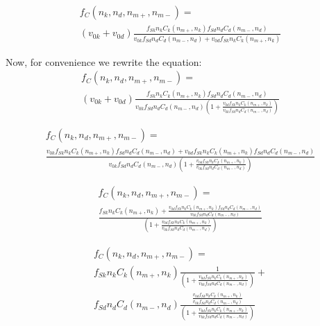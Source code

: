 \begin{equation}
\begin{split}
f_C(n_k, n_d, n_{m+}, n_{m-}) = \\
(v_{0k} + v_{0d})\frac{f_{Sk}n_kC_k(n_{m+}, n_k)f_{Sd}n_dC_d(n_{m-},n_d)}{v_{0k}f_{Sd}n_dC_d(n_{m-},n_d) + v_{0d}f_{Sk}n_kC_k(n_{m+}, n_k)}
\end{split}
\end{equation}

Now, for convenience we rewrite the equation:
\begin{equation}
\begin{split}
f_C(n_k, n_d, n_{m+}, n_{m-}) = \\
(v_{0k} + v_{0d})\frac{f_{Sk}n_kC_k(n_{m+}, n_k)f_{Sd}n_dC_d(n_{m-},n_d)}
{v_{0k}f_{Sd}n_dC_d(n_{m-},n_d) (1 + \frac{v_{0d}f_{Sk}n_kC_k(n_{m+}, n_k)}{v_{0k}f_{Sd}n_dC_d(n_{m-},n_d)})}
\end{split}
\end{equation}

\begin{equation}
\begin{split}
f_C(n_k, n_d, n_{m+}, n_{m-}) = \\
\frac{v_{0k}f_{Sk}n_kC_k(n_{m+}, n_k)f_{Sd}n_dC_d(n_{m-},n_d) + v_{0d}f_{Sk}n_kC_k(n_{m+}, n_k)f_{Sd}n_dC_d(n_{m-},n_d)}
{v_{0k}f_{Sd}n_dC_d(n_{m-},n_d) (1 + \frac{v_{0d}f_{Sk}n_kC_k(n_{m+}, n_k)}{v_{0k}f_{Sd}n_dC_d(n_{m-},n_d)})}
\end{split}
\end{equation}

\begin{equation}
\begin{split}
f_C(n_k, n_d, n_{m+}, n_{m-}) = \\
\frac{f_{Sk}n_kC_k(n_{m+}, n_k) + \frac{v_{0d}f_{Sk}n_kC_k(n_{m+}, n_k)f_{Sd}n_dC_d(n_{m-},n_d)}{v_{0k}f_{Sd}n_dC_d(n_{m-},n_d)}}
{(1 + \frac{v_{0d}f_{Sk}n_kC_k(n_{m+}, n_k)}{v_{0k}f_{Sd}n_dC_d(n_{m-},n_d)})}
\end{split}
\end{equation}

\begin{equation}
\begin{split}
f_C(n_k, n_d, n_{m+}, n_{m-}) = \\
f_{Sk}n_kC_k(n_{m+}, n_k) \frac{1}{(1 + \frac{v_{0d}f_{Sk}n_kC_k(n_{m+}, n_k)}{v_{0k}f_{Sd}n_dC_d(n_{m-},n_d)})} + \\
f_{Sd}n_dC_d(n_{m-},n_d)\frac{\frac{v_{0d}f_{Sk}n_kC_k(n_{m+}, n_k)}{v_{0k}f_{Sd}n_dC_d(n_{m-},n_d)}}
{(1 + \frac{v_{0d}f_{Sk}n_kC_k(n_{m+}, n_k)}{v_{0k}f_{Sd}n_dC_d(n_{m-},n_d)})}
\end{split}
\end{equation}

